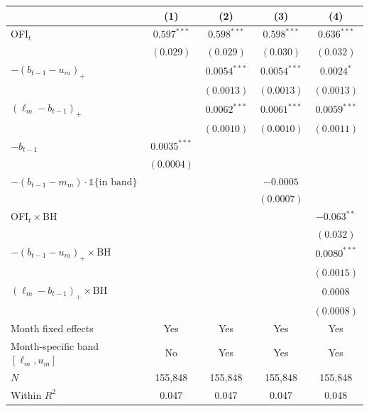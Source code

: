 \begin{tabular}{lcccc}
\toprule
 & (1) & (2) & (3) & (4) \\
\midrule
OFI$_t$ & $0.597^{***}$ & $0.598^{***}$ & $0.598^{***}$ & $0.636^{***}$ \\
 & $(0.029)$ & $(0.029)$ & $(0.030)$ & $(0.032)$ \\
$-(b_{t-1}-u_m)_+$ \;[$\kappa^+$] &  & $0.0054^{***}$ & $0.0054^{***}$ & $0.0024^{*}$ \\
 &  & $(0.0013)$ & $(0.0013)$ & $(0.0013)$ \\
$(\ell_m-b_{t-1})_+$ \;[$\kappa^-$] &  & $0.0062^{***}$ & $0.0061^{***}$ & $0.0059^{***}$ \\
 &  & $(0.0010)$ & $(0.0010)$ & $(0.0011)$ \\
$-b_{t-1}$  & $0.0035^{***}$ &  &  &  \\
 & $(0.0004)$ &  &  &  \\
$-(b_{t-1}-m_m)\cdot\mathbb 1\{\text{in band}\}$ &  &  & $-0.0005$ &  \\
 &  &  & $(0.0007)$ &  \\
OFI$_t\times$BH &  &  &  & $-0.063^{**}$ \\
 &  &  &  & $(0.032)$ \\
$-(b_{t-1}-u_m)_+\times$BH &  &  &  & $0.0080^{***}$ \\
 &  &  &  & $(0.0015)$ \\
$(\ell_m-b_{t-1})_+\times$BH &  &  &  & $0.0008$ \\
 &  &  &  & $(0.0008)$ \\
\midrule
Month fixed effects & Yes & Yes & Yes & Yes \\
Month-specific band $[\ell_m,u_m]$ & No & Yes & Yes & Yes \\
$N$ & 155,848 & 155,848 & 155,848 & 155,848 \\
Within $R^2$ & 0.047 & 0.047 & 0.047 & 0.048 \\
\bottomrule
\end{tabular}
